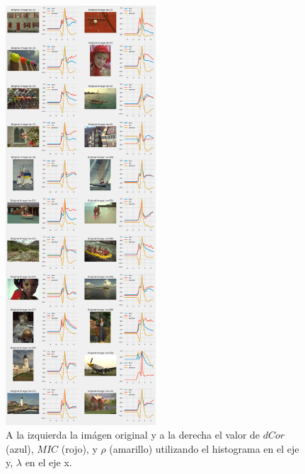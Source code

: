 \begin{figure}
    \centering
    \includegraphics[width=0.5\textwidth]{figuras/hist_comp.png}
    \caption{A la izquierda la im\'agen original y a la derecha el valor de $dCor$ (azul), $MIC$ (rojo), y $\rho$ (amarillo) utilizando el histograma en el eje y, $\lambda$ en el eje x.}
\end{figure}

